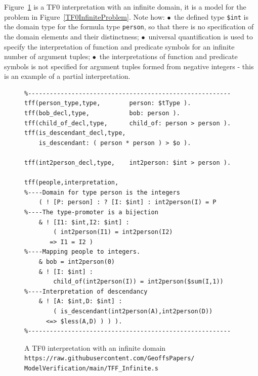 \documentclass[letterpaper]{article}
\newcommand{\smalltt}[1]{\small \texttt{#1}}
\begin{document}
Figure~\ref{TF0InfiniteInterpretation} is a TF0 interpretation with an infinite domain, it 
is a model for the problem in Figure~\ref{TF0InfiniteProblem}.
Note how:
$\bullet$~the defined type \smalltt{\$int} is the domain type for the formula type \smalltt{person},
so that there is no specification of the domain elements and their distinctness;
$\bullet$~universal quantification is used to specify the interpretation of function and predicate
symbols for an infinite number of argument tuples;
$\bullet$~the interpretations of function and predicate symbols is not specified for argument 
tuples formed from negative integers - this is an example of a partial interpretation.

\begin{figure}[tbhp]
\scriptsize
{}
\begin{verbatim}
%--------------------------------------------------------
tff(person_type,type,        person: $tType ).
tff(bob_decl,type,           bob: person ).
tff(child_of_decl,type,      child_of: person > person ).
tff(is_descendant_decl,type, 
    is_descendant: ( person * person ) > $o ).

tff(int2person_decl,type,    int2person: $int > person ).

tff(people,interpretation,
%----Domain for type person is the integers
    ( ! [P: person] : ? [I: $int] : int2person(I) = P
%----The type-promoter is a bijection
    & ! [I1: $int,I2: $int] : 
        ( int2person(I1) = int2person(I2) 
       => I1 = I2 )
%----Mapping people to integers. 
    & bob = int2person(0)
    & ! [I: $int] : 
        child_of(int2person(I)) = int2person($sum(I,1))
%----Interpretation of descendancy
    & ! [A: $int,D: $int] : 
        ( is_descendant(int2person(A),int2person(D)) 
      <=> $less(A,D) ) ) ).
%--------------------------------------------------------
\end{verbatim}
\caption{A TF0 interpretation with an infinite domain\\
{\scriptsize {\tt https://raw.githubusercontent.com/GeoffsPapers/\\
ModelVerification/main/TFF\_Infinite.s}}}
\label{TF0InfiniteInterpretation}
\end{figure}

\end{document}
